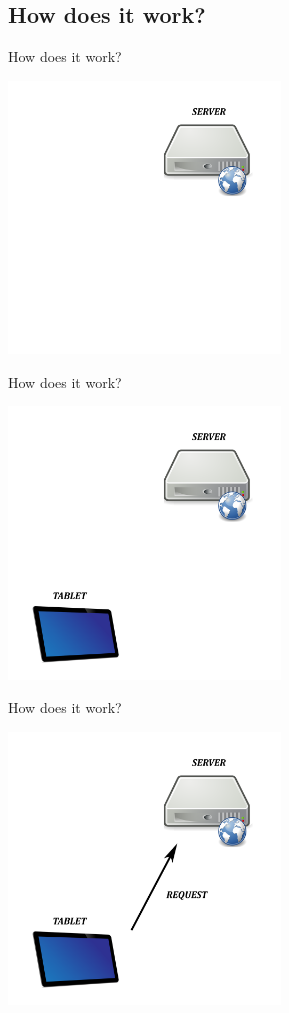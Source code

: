 \documentclass[a4paper,10pt]{beamer}
\begin{document}
		\subsection{How does it work?}
		
			\begin{frame}{How does it work?}
				\centerline{\includegraphics[height=205pt]{images/network/server.png}}
			\end{frame}
		
			\begin{frame}{How does it work?}
				\centerline{\includegraphics[height=205pt]{images/network/tabletandserver.png}}
			\end{frame}
		
			\begin{frame}{How does it work?}
				\centerline{\includegraphics[height=205pt]{images/network/request.png}}
			\end{frame}
			
\end{document}
